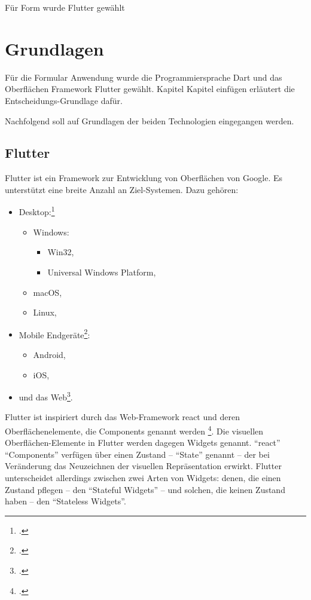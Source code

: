 
Für Form wurde Flutter gewählt

\section{Grundlagen}

Für die Formular Anwendung wurde die Programmiersprache Dart und das Oberflächen Framework Flutter gewählt.
Kapitel Kapitel einfügen  erläutert die Entscheidungs-Grundlage dafür.

Nachfolgend soll auf  Grundlagen der beiden Technologien eingegangen werden.

\subsection{Flutter}

Flutter ist ein Framework zur Entwicklung von Oberflächen von Google.
Es unterstützt eine breite Anzahl an Ziel-Systemen.
 Dazu gehören:

\begin{itemize}
  \item Desktop:\footcite[Vgl.][]{DesktopSupportForFlutter}
        \begin{itemize}
          \item Windows:
                \begin{itemize}
                  \item Win32,
                  \item Universal Windows Platform,
                \end{itemize}
          \item macOS,
          \item Linux,
        \end{itemize}
  \item Mobile Endgeräte\footcite[Vgl.][]{FlutterBeautifulNativeAppsInRecordTime}:
        \begin{itemize}
          \item Android,
          \item iOS,
        \end{itemize}
  \item und das Web\footcite[Vgl.][]{WebSupportForFlutter}.
\end{itemize}

Flutter ist inspiriert durch das Web-Framework react und deren Oberflächenelemente, die Components genannt werden \footcite[Vgl.][]{IntroductionToWidgets}.
Die visuellen Oberflächen-Elemente in Flutter werden dagegen Widgets genannt.
\enquote{react} \enquote{Components} verfügen über einen Zustand – \enquote{State} genannt – der bei Veränderung das Neuzeichnen der visuellen Repräsentation erwirkt.
Flutter unterscheidet allerdings zwischen zwei Arten von Widgets: denen, die einen Zustand pflegen – den \enquote{Stateful Widgets} – und solchen, die keinen Zustand haben – den \enquote{Stateless Widgets}.

